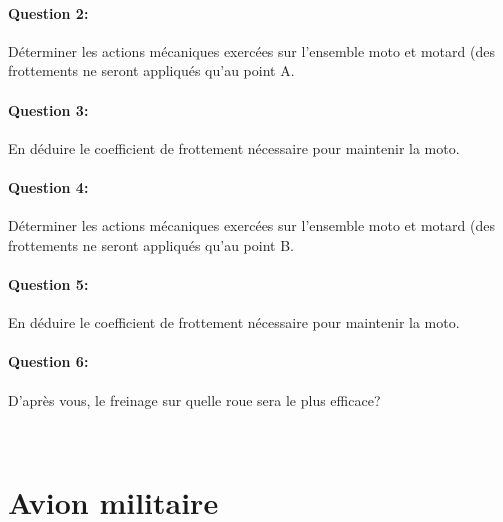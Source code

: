 \paragraph{Question 2:} Déterminer les actions mécaniques exercées sur l'ensemble moto et motard (des frottements ne seront appliqués qu'au point A.

\paragraph{Question 3:} En déduire le coefficient de frottement nécessaire pour maintenir la moto.

\paragraph{Question 4:} Déterminer les actions mécaniques exercées sur l'ensemble moto et motard (des frottements ne seront appliqués qu'au point B.

\paragraph{Question 5:} En déduire le coefficient de frottement nécessaire pour maintenir la moto.

\paragraph{Question 6:} D'après vous, le freinage sur quelle roue sera le plus efficace?


\newpage

~\

\newpage

\section{Avion militaire}

